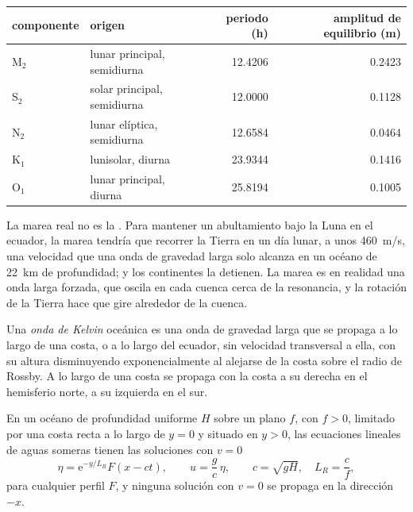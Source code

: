 \begin{center}
\small
\begin{tabular}{llrr}
\hline
componente & origen & periodo (\unit{h}) & amplitud de equilibrio (\unit{m}) \\
\hline
M$_2$ & lunar principal, semidiurna & \num{12.4206} & \num{0.2423} \\
S$_2$ & solar principal, semidiurna & \num{12.0000} & \num{0.1128} \\
N$_2$ & lunar elíptica, semidiurna & \num{12.6584} & \num{0.0464} \\
K$_1$ & lunisolar, diurna & \num{23.9344} & \num{0.1416} \\
O$_1$ & lunar principal, diurna & \num{25.8194} & \num{0.1005} \\
\hline
\end{tabular}
\end{center}

La marea real no es la . Para mantener un abultamiento bajo la Luna
en el ecuador, la marea tendría que recorrer la Tierra en un día lunar,
a unos \qty{460}{m/s}, una velocidad que una onda de gravedad larga solo alcanza
en un océano de \qty{22}{km} de profundidad; y los continentes la detienen. La marea es
en realidad una onda larga forzada, que oscila en cada cuenca cerca de la resonancia, y la
rotación de la Tierra hace que gire alrededor de la cuenca.

\begin{definition}\label{def:b3:ocean-dynamics:kelvin-wave}
Una \emph{onda de Kelvin} oceánica es una onda de gravedad larga
que se propaga a lo largo de una costa, o a lo largo del ecuador, sin velocidad transversal
a ella, con su altura disminuyendo exponencialmente al alejarse de la costa sobre el
radio de Rossby. A lo largo de una costa se propaga con la costa a su derecha en el
hemisferio norte, a su izquierda en el sur.
\end{definition}

\begin{theorem}\label{thm:b3:ocean-dynamics:kelvin}
En un océano de profundidad uniforme $H$ sobre un plano $f$, con $f > 0$, limitado por una
costa recta a lo largo de $y = 0$ y situado en $y > 0$, las ecuaciones lineales de aguas someras
tienen las soluciones con $v = 0$
\[
\eta = \mathrm e^{-y/L_R}F(x - ct),\qquad u = \frac{g}{c}\,\eta,\qquad
c = \sqrt{gH},\quad L_R = \frac{c}{f},
\]
para cualquier perfil $F$, y ninguna solución con $v = 0$ se propaga en la dirección
$-x$.
\end{theorem}

